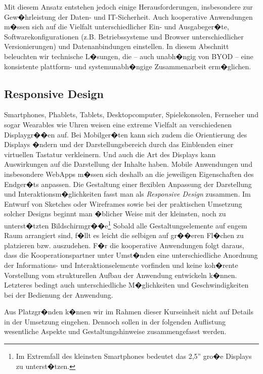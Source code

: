 Mit diesem Ansatz entstehen jedoch einige Herausforderungen, insbesondere zur Gew�hrleistung der Daten- und IT-Sicherheit. Auch kooperative Anwendungen m�ssen sich auf die Vielfalt unterschiedlicher Ein- und Ausgabeger�te, Softwarekonfigurationen (z.B. Betriebssysteme und Browser unterschiedlicher Versionierungen) und Datenanbindungen einstellen. In diesem Abschnitt beleuchten wir technische L�sungen, die -- auch unabh�ngig von BYOD -- eine konsistente plattform- und systemunabh�ngige  Zusammenarbeit erm�glichen.


\subsection{Responsive Design} 
Smartphones, Phablets, Tablets, Desktopcomputer, Spielekonsolen, Fernseher und sogar Wearables wie Uhren weisen eine extreme Vielfalt an verschiedenen Displaygr��en auf. Bei Mobilger�ten kann sich zudem die Orientierung des Displays �ndern und der Darstellungsbereich durch das Einblenden einer virtuellen Tastatur verkleinern. Und auch die Art des Displays kann Auswirkungen auf die Darstellung der Inhalte haben. Mobile Anwendungen und insbesondere WebApps m�ssen sich deshalb an die jeweiligen Eigenschaften des Endger�ts anpassen. Die Gestaltung einer flexiblen Anpassung der Darstellung und Interaktionsm�glichkeiten fasst man als \textit{Responsive Design} zusammen. Im Entwurf von Sketches oder Wireframes sowie bei der praktischen Umsetzung solcher Designs beginnt man �blicher Weise mit der kleinsten, noch zu unterst�tzten Bildschirmgr��e\footnote{Im Extremfall des kleinsten Smartphones bedeutet das 2,5'' gro�e Displays zu unterst�tzen.} Sobald alle Gestaltungselemente auf engem Raum arrangiert sind, f�llt es leicht die selbigen auf gr��eren Fl�chen zu platzieren bzw. auszudehen. F�r die kooperative Anwendungen folgt daraus, dass die Kooperationspartner unter Umst�nden eine unterschiedliche Anordnung der Informations- und Interaktionselemente vorfinden und keine koh�rente Vorstellung vom strukturellen Aufbau der Anwendung entwickeln k�nnen. Letzteres bedingt auch unterschiedliche M�glichkeiten und Geschwindigkeiten bei der Bedienung der Anwendung.

Aus Platzgr�nden k�nnen wir im Rahmen dieser Kurseinheit nicht auf Details in der Umsetzung eingehen. Dennoch sollen in der folgenden Auflistung wesentliche Aspekte und Gestaltungshinweise zusammengefasst werden. 

